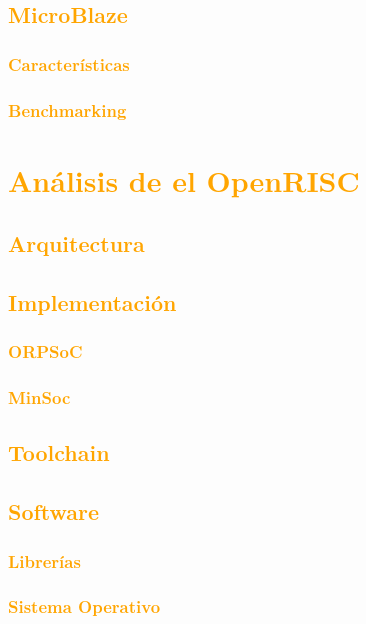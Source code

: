 \documentclass[a4paper,11pt]{article}
\begin{document}
	\subsection{\textcolor{orange}{MicroBlaze}}
		\subsubsection{\textcolor{orange}{Características}}
		\subsubsection{\textcolor{orange}{Benchmarking}}

\section{\textcolor{orange}{Análisis de el OpenRISC }}
		\subsection{\textcolor{orange}{Arquitectura}}
		\subsection{\textcolor{orange}{Implementación}}
			\subsubsection{\textcolor{orange}{ORPSoC}}
			\subsubsection{\textcolor{orange}{MinSoc}}
		\subsection{\textcolor{orange}{Toolchain}}
		\subsection{\textcolor{orange}{Software}}
			\subsubsection{\textcolor{orange}{Librerías}}
			\subsubsection{\textcolor{orange}{Sistema Operativo}}
			
	
\end{document}
